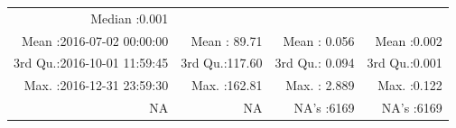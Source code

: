 \documentclass[
  10pt,
  a4paper,oneside]{article}
\begin{document}
\begin{longtable}[]{@{}rrrr@{}}
\begin{minipage}[t]{0.19\columnwidth}
Median :0.001\strut
\end{minipage}\tabularnewline
\begin{minipage}[t]{0.33\columnwidth}\raggedleft
Mean :2016-07-02 00:00:00\strut
\end{minipage} & \begin{minipage}[t]{0.19\columnwidth}\raggedleft
Mean : 89.71\strut
\end{minipage} & \begin{minipage}[t]{0.19\columnwidth}\raggedleft
Mean : 0.056\strut
\end{minipage} & \begin{minipage}[t]{0.19\columnwidth}\raggedleft
Mean :0.002\strut
\end{minipage}\tabularnewline
\begin{minipage}[t]{0.33\columnwidth}\raggedleft
3rd Qu.:2016-10-01 11:59:45\strut
\end{minipage} & \begin{minipage}[t]{0.19\columnwidth}\raggedleft
3rd Qu.:117.60\strut
\end{minipage} & \begin{minipage}[t]{0.19\columnwidth}\raggedleft
3rd Qu.: 0.094\strut
\end{minipage} & \begin{minipage}[t]{0.19\columnwidth}\raggedleft
3rd Qu.:0.001\strut
\end{minipage}\tabularnewline
\begin{minipage}[t]{0.33\columnwidth}\raggedleft
Max. :2016-12-31 23:59:30\strut
\end{minipage} & \begin{minipage}[t]{0.19\columnwidth}\raggedleft
Max. :162.81\strut
\end{minipage} & \begin{minipage}[t]{0.19\columnwidth}\raggedleft
Max. : 2.889\strut
\end{minipage} & \begin{minipage}[t]{0.19\columnwidth}\raggedleft
Max. :0.122\strut
\end{minipage}\tabularnewline
\begin{minipage}[t]{0.33\columnwidth}\raggedleft
NA\strut
\end{minipage} & \begin{minipage}[t]{0.19\columnwidth}\raggedleft
NA\strut
\end{minipage} & \begin{minipage}[t]{0.19\columnwidth}\raggedleft
NA's :6169\strut
\end{minipage} & \begin{minipage}[t]{0.19\columnwidth}\raggedleft
NA's :6169\strut
\end{minipage}\tabularnewline
\bottomrule
\end{longtable}
\end{document}
